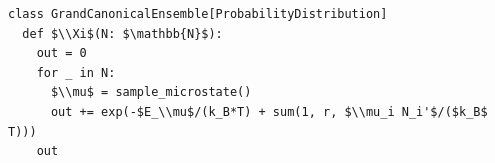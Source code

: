 \documentclass[border=10pt]{standalone}
\begin{document}
\begin{lstlisting}
class GrandCanonicalEnsemble[ProbabilityDistribution]
  def $\\Xi$(N: $\mathbb{N}$):
    out = 0
    for _ in N:
      $\\mu$ = sample_microstate()
      out += exp(-$E_\\mu$/(k_B*T) + sum(1, r, $\\mu_i N_i'$/($k_B$ T)))
    out
\end{lstlisting}
\end{document}
